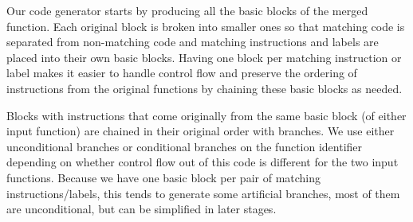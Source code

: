 Our code generator starts by producing all the basic blocks of the merged function.
Each original block is broken into smaller ones so that matching code is
separated from non-matching code and matching instructions and labels are placed
into their own basic blocks. Having one block per matching instruction or label
makes it easier to handle control flow and preserve the ordering of instructions
from the original functions by chaining these basic blocks as needed.

Blocks with instructions that come originally from the same basic block (of either input function) are chained in their original order with
branches. We use either unconditional branches or conditional branches on the function identifier depending on whether control flow out of
this code is different for the two input functions. Because we have one basic block per pair of matching instructions/labels, this tends to
generate some artificial branches, most of them are unconditional, but can be simplified in later stages.







